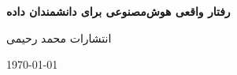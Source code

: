 
\begin{titlepage}
    \begin{center}
        \vspace*{1cm}

        {\huge \textbf{رفتار واقعی هوش‌مصنوعی برای دانشمندان داده}}

        \vspace{0.5cm}


        \LARGE انتشارات محمد رحیمی

        \large{\today}

    \end{center}
\end{titlepage}